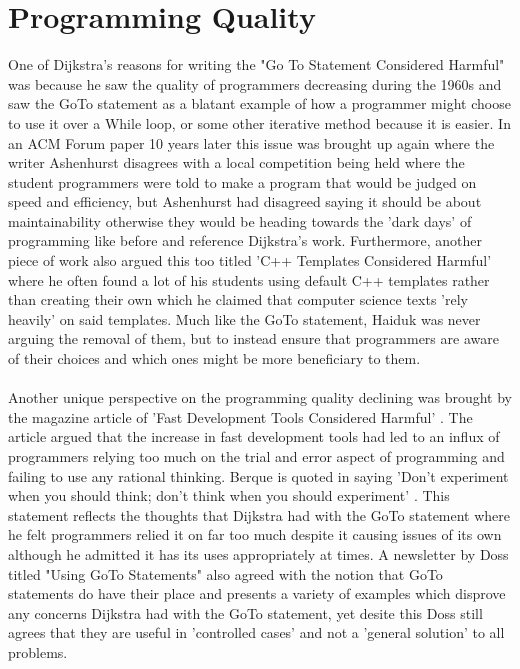 \documentclass{article}
\begin{document}
\section{Programming Quality}
One of Dijkstra's reasons for writing the "Go To Statement Considered Harmful" \cite{dijkstra1968_goto} was because he saw the quality of programmers decreasing during the 1960s and saw the GoTo statement as a blatant example of how a programmer might choose to use it over a While loop, or some other iterative method because it is easier. In an ACM Forum paper 10 years later this issue was brought up again where the writer Ashenhurst disagrees with a local competition being held where the student programmers were told to make a program that would be judged on speed and efficiency, but Ashenhurst had disagreed saying it should be about maintainability otherwise they would be heading towards the 'dark days' \cite{Ashenhurst:1978:AFS:359327.359339} of programming like before and reference Dijkstra's work. Furthermore, another piece of work also argued this too titled 'C++ Templates Considered Harmful' \cite{Haiduk:2004:CTC:1050231.1050261} where he often found a lot of his students using default C++ templates rather than creating their own which he claimed that computer science texts 'rely heavily' \cite{Haiduk:2004:CTC:1050231.1050261} on said templates. Much like the GoTo statement, Haiduk was never arguing the removal of them, but to instead ensure that programmers are aware of their choices and which ones might be more beneficiary to them.
\\
\\
Another unique perspective on the programming quality declining was brought by the magazine article of 'Fast Development Tools Considered Harmful' \cite{Berque:2013:FDT:2505990.2506003}. The article argued that the increase in fast development tools had led to an influx of programmers relying too much on the trial and error aspect of programming and failing to use any rational thinking. Berque is quoted in saying 'Don't experiment when you should think; don't think when you should experiment' \cite{Berque:2013:FDT:2505990.2506003}. This statement reflects the thoughts that Dijkstra had with the GoTo statement where he felt programmers relied it on far too much despite it causing issues of its own although he admitted it has its uses appropriately at times. A newsletter by Doss titled "Using GoTo Statements" \cite{Doss:2014:UGS:2659118.2659129} also agreed with the notion that GoTo statements do have their place and presents a variety of examples which disprove any concerns Dijkstra had with the GoTo statement, yet desite this Doss still agrees that they are useful in 'controlled cases' and not a 'general solution' to all problems.
\end{document}
